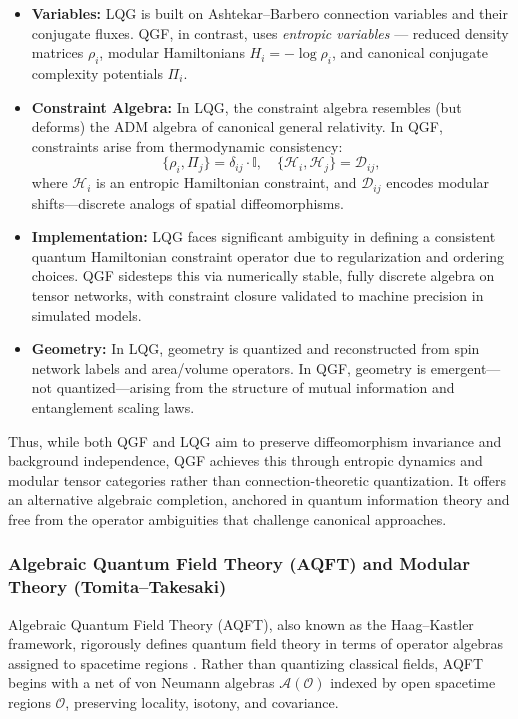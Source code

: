 \documentclass[11pt]{article}
\begin{document}
\begin{itemize}
  \item \textbf{Variables:} LQG is built on Ashtekar–Barbero connection variables and their conjugate fluxes. QGF, in contrast, uses \emph{entropic variables} — reduced density matrices \( \rho_i \), modular Hamiltonians \( H_i = -\log \rho_i \), and canonical conjugate complexity potentials \( \Pi_i \).
  
  \item \textbf{Constraint Algebra:} In LQG, the constraint algebra resembles (but deforms) the ADM algebra of canonical general relativity. In QGF, constraints arise from thermodynamic consistency:
  \[
  \{\rho_i, \Pi_j\} = \delta_{ij} \cdot \mathbb{I}, \quad \{\mathcal{H}_i, \mathcal{H}_j\} = \mathcal{D}_{ij},
  \]
  where \( \mathcal{H}_i \) is an entropic Hamiltonian constraint, and \( \mathcal{D}_{ij} \) encodes modular shifts—discrete analogs of spatial diffeomorphisms.
  
  \item \textbf{Implementation:} LQG faces significant ambiguity in defining a consistent quantum Hamiltonian constraint operator due to regularization and ordering choices. QGF sidesteps this via numerically stable, fully discrete algebra on tensor networks, with constraint closure validated to machine precision in simulated models.
  
  \item \textbf{Geometry:} In LQG, geometry is quantized and reconstructed from spin network labels and area/volume operators. In QGF, geometry is emergent—not quantized—arising from the structure of mutual information and entanglement scaling laws.
\end{itemize}

Thus, while both QGF and LQG aim to preserve diffeomorphism invariance and background independence, QGF achieves this through entropic dynamics and modular tensor categories rather than connection-theoretic quantization. It offers an alternative algebraic completion, anchored in quantum information theory and free from the operator ambiguities that challenge canonical approaches.

\subsubsection{Algebraic Quantum Field Theory (AQFT) and Modular Theory (Tomita–Takesaki)}

Algebraic Quantum Field Theory (AQFT), also known as the Haag–Kastler framework, rigorously defines quantum field theory in terms of operator algebras assigned to spacetime regions \cite{Haag1996}. Rather than quantizing classical fields, AQFT begins with a net of von Neumann algebras \( \mathcal{A}(\mathcal{O}) \) indexed by open spacetime regions \( \mathcal{O} \), preserving locality, isotony, and covariance.
\end{document}
